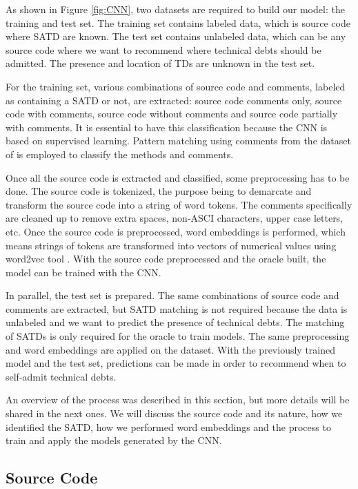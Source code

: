 As shown in Figure \ref{fig:CNN}, two datasets are required to build our model: the training and test set. The training set contains labeled data, which is source code where SATD are known. The test set contains unlabeled data, which can be any source code where we want to recommend where technical debts should be admitted. The presence and location of TDs are unknown in the test set.

For the training set, various combinations of source code and comments, labeled as containing a SATD or not, are extracted: source code comments only, source code with comments, source code without comments and source code partially with comments. It is essential to have this classification because the CNN is based on supervised learning. Pattern matching using comments from the dataset of \citet{maldonado17} is employed to classify the methods and comments.

Once all the source code is extracted and classified, some preprocessing has to be done. The source code is tokenized, the purpose being to demarcate and transform the source code into a string of word tokens. The comments specifically are cleaned up to remove extra spaces, non-ASCI characters, upper case letters, etc. Once the source code is preprocessed, word embeddings is performed, which means strings of tokens are transformed into vectors of numerical values using word2vec tool \citep{word2vec}. With the source code preprocessed and the oracle built, the model can be trained with the CNN.

In parallel, the test set is prepared. The same combinations of source code and comments are extracted, but SATD matching is not required because the data is unlabeled and we want to predict the presence of technical debts. The matching of SATDs is only required for the oracle to train models. The same preprocessing and word embeddings are applied on the dataset. With the previously trained model and the test set, predictions can be made in order to recommend when to self-admit technical debts.

An overview of the process was described in this section, but more details will be shared in the next ones. We will discuss the source code and its nature, how we identified the SATD, how we performed word embeddings and the process to train and apply the models generated by the CNN.

\subsection{Source Code}


